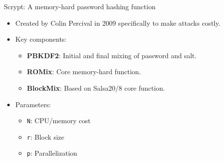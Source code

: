 \documentclass[aspectratio=169, lualatex, handout]{beamer}
\begin{document}
\begin{frame}{Scrypt: A memory-hard password hashing function}
	\begin{itemize}
		\item Created by Colin Percival in 2009 specifically to make attacks costly.
		\item Key components:
		      \begin{itemize}
			      \item \textbf{PBKDF2}: Initial and final mixing of password and salt.
			      \item \textbf{ROMix}: Core memory-hard function.
			      \item \textbf{BlockMix}: Based on Salsa20/8 core function.
		      \end{itemize}
		      \item{Parameters:}
		      \begin{itemize}
			      \item \texttt{N}: CPU/memory cost
			      \item \texttt{r}: Block size
			      \item \texttt{p}: Parallelization
		      \end{itemize}
	\end{itemize}
\end{frame}
\end{document}
